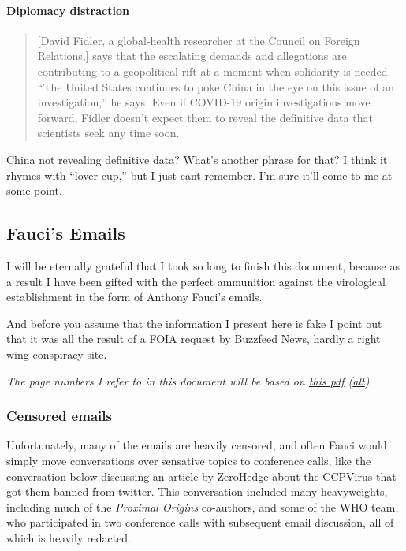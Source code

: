 \documentclass[11pt]{article}
\begin{document}
\paragraph{Diplomacy distraction}
\label{sec:orgaa25b8c}
\begin{quote}
[David Fidler, a global-health researcher at the Council on Foreign Relations,] says that the escalating demands and allegations are contributing to a geopolitical rift at a moment when solidarity is needed. “The United States continues to poke China in the eye on this issue of an investigation,” he says. Even if COVID-19 origin investigations move forward, Fidler doesn’t expect them to reveal the definitive data that scientists seek any time soon.
\end{quote}
China not revealing definitive data? What's another phrase for that? I think it rhymes with ``lover cup,'' but I just cant remember. I'm sure it'll come to me at some point.

\subsection{Fauci's Emails}
\label{sec:orga9c8a6a}
I will be eternally grateful that I took so long to finish this document, because as a result I have been gifted with the perfect ammunition against the virological establishment in the form of Anthony Fauci's emails.

And before you assume that the information I present here is fake I point out that it was all the result of a FOIA request by Buzzfeed News, hardly a right wing conspiracy site.

\emph{The page numbers I refer to in this document will be based on \href{https://patriots.win/p/12ih58cg0U/dr-mengele-fauci-foia-dump-origi/}{this pdf} (\href{https://www.documentcloud.org/documents/20793561-leopold-nih-foia-anthony-fauci-emails}{alt})}

\subsubsection{Censored emails}
\label{sec:orgdbfb386}
Unfortunately, many of the emails are heavily censored, and often Fauci would simply move conversations over sensative topics to conference calls, like the conversation below discussing an article by ZeroHedge about the CCPVirus that got them banned from twitter. This conversation included many heavyweights, including much of the \emph{Proximal Origins} co-authors, and some of the WHO team, who participated in two conference calls with subsequent email discussion, all of which is heavily redacted.
\end{document}
